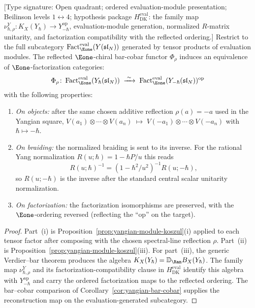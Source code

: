 \begin{theorem}\label{thm:factorization-dk-eval}
\textup{[Type signature: Open quadrant; ordered evaluation-module
presentation; Beilinson levels $1\leftrightarrow4$; hypothesis
package $H_{\mathrm{DK}}^{\mathrm{eval}}$: the family map
$\nu_{\hbar,\rho}^{Y}\colon K_X(Y_\hbar)\to Y_{-\hbar}^{\mathrm{op}}$,
evaluation-module generation, normalized $R$-matrix unitarity, and
factorization compatibility with the reflected ordering.]}
Restrict to the full subcategory
$\operatorname{Fact}_{\Eone}^{\mathrm{eval}}(Y(\mathfrak{sl}_N))$
generated by tensor products of evaluation modules. The reflected
$\Eone$-chiral bar-cobar functor $\Phi_\rho$ induces an equivalence of
$\Eone$-factorization categories:
\begin{equation}\label{eq:factorization-dk-eval}
\Phi_\rho \colon
\operatorname{Fact}_{\Eone}^{\mathrm{eval}}(Y_\hbar(\mathfrak{sl}_N))
\;\xrightarrow{\;\sim\;}\;
\operatorname{Fact}_{\Eone}^{\mathrm{eval}}
 (Y_{-\hbar}(\mathfrak{sl}_N))^{\mathrm{op}}
\end{equation}
with the following properties:
\begin{enumerate}[label=\textup{(\roman*)}]
\item \emph{On objects:} after the same chosen additive reflection
 $\rho(a)=-a$ used in the Yangian square,
 $V(a_1) \otimes \cdots \otimes V(a_n)
 \;\mapsto\; V(-a_1) \otimes \cdots \otimes V(-a_n)$
 with $\hbar \mapsto -\hbar$.
\item \emph{On braiding:}
 the normalized braiding is sent to its inverse. For the rational
 Yang normalization $R(u;\hbar)=1-\hbar P/u$ this reads
 \[
 R(u;\hbar)^{-1}
 =
 (1-\hbar^2/u^2)^{-1}R(u;-\hbar),
 \]
 so $R(u;-\hbar)$ is the inverse after the standard central scalar
 unitarity normalization.
\item \emph{On factorization:} the factorization isomorphisms
 are preserved, with the $\Eone$-ordering reversed
 \textup{(}reflecting the ``op'' on the target\textup{)}.
\end{enumerate}
\end{theorem}

\begin{proof}
Part~(i) is Proposition~\ref{prop:yangian-module-koszul}(i)
applied to each tensor factor after composing with the chosen
spectral-line reflection $\rho$. Part~(ii) is
Proposition~\ref{prop:yangian-module-koszul}(iii). For
part~(iii), the generic Verdier--bar theorem produces the algebra
$K_X(Y_\hbar)=\mathbb D_{\Ran}B_X(Y_\hbar)$.  The family map
$\nu_{\hbar,\rho}^{Y}$ and its factorization-compatibility clause in
$H_{\mathrm{DK}}^{\mathrm{eval}}$ identify this algebra with
$Y_{-\hbar}^{\mathrm{op}}$ and carry the ordered factorization maps to
the reflected ordering.  The bar--cobar comparison of
Corollary~\ref{cor:yangian-bar-cobar} supplies the reconstruction map
on the evaluation-generated subcategory.
\end{proof}

